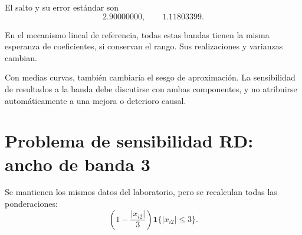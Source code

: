 \documentclass[11pt,a4paper]{article}
\begin{document}
El salto y su error estándar son
\[
2.90000000,\qquad 1.11803399.
\]

En el mecanismo lineal de referencia,
todas estas bandas tienen la misma
esperanza de coeficientes,
si conservan el rango.
Sus realizaciones y varianzas cambian.

Con medias curvas, también cambiaría
el sesgo de aproximación.
La sensibilidad de resultados a la banda
debe discutirse con ambas componentes,
y no atribuirse automáticamente
a una mejora o deterioro causal.

\clearpage
\section{Problema de sensibilidad RD: ancho de banda 3}\label{unidad58}
Se mantienen los mismos datos del laboratorio,
pero se recalculan todas las ponderaciones:
\[
\left(1-\frac{|x_{i2}|}{3}\right)
\mathbf1\{|x_{i2}|\le3\}.
\]
\end{document}
